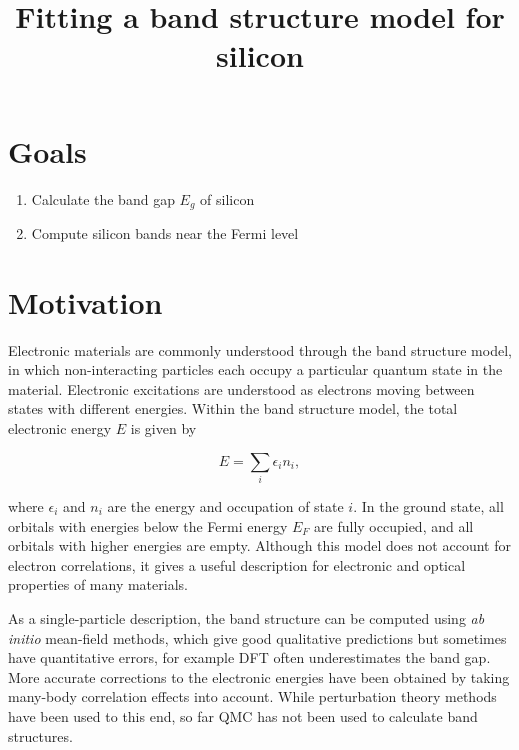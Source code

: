 

\title{\vspace{-3em} Fitting a band structure model for silicon\vspace{-2em}}
\date{}


\maketitle

\section{Goals}

\begin{enumerate}
\item Calculate the band gap $E_g$ of silicon
\item Compute silicon bands near the Fermi level 
\end{enumerate}

\section{Motivation}

Electronic materials are commonly understood through the band structure model, in which non-interacting particles each occupy a particular quantum state in the material. 
Electronic excitations are understood as electrons moving between states with different energies.
Within the band structure model, the total electronic energy $E$ is given by

\begin{equation}\label{eq:bsm}
E = \sum_i \epsilon_i n_i,
\end{equation}

where $\epsilon_i$ and $n_i$ are the energy and occupation of state $i$.  
In the ground state, all orbitals with energies below the Fermi energy $E_F$ are fully occupied, and all orbitals with higher energies are empty. 
Although this model does not account for electron correlations, it gives a useful description for electronic and optical properties of many materials.

As a single-particle description, the band structure can be computed using \emph{ab initio} mean-field methods, which give good qualitative predictions but sometimes have quantitative errors, for example DFT often underestimates the band gap.
More accurate corrections to the electronic energies have been obtained by taking many-body correlation effects into account.
While perturbation theory methods have been used to this end, so far QMC has not been used to calculate band structures.

